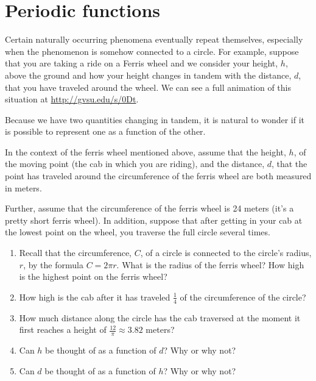 \documentclass[nooutcomes]{ximera}
\begin{document}

\section{Periodic functions}

Certain naturally occurring phenomena eventually repeat themselves, especially when the phenomenon is somehow connected to a circle. For example, suppose that you are taking a ride on a Ferris wheel and we consider your height, $h$, above the ground and how your height changes in tandem with the distance, $d$, that you have traveled around the wheel. We can see a full animation of this situation at \url{http://gvsu.edu/s/0Dt}. 

Because we have two quantities changing in tandem, it is natural to wonder if it is possible to represent one as a function of the other.


\begin{exploration}
In the context of the ferris wheel mentioned above, assume that the height, $h$, of the moving point (the cab in which you are riding), and the distance, $d$, that the point has traveled around the circumference of the ferris wheel are both measured in meters.

Further, assume that the circumference of the ferris wheel is 24 meters (it's a pretty short ferris wheel). In addition, suppose that after getting in your cab at the lowest point on the wheel, you traverse the full circle several times.

\begin{enumerate}
\item Recall that the circumference, $C$, of a circle is connected to the circle's radius, $r$, by the formula $C = 2\pi r$. What is the radius of the ferris wheel? How high is the highest point on the ferris wheel?

\item How high is the cab after it has traveled $\frac{1}{4}$ of the circumference of the circle?

\item How much distance along the circle has the cab traversed at the moment it first reaches a height of $\frac{12}{\pi} \approx 3.82$ meters?

\item Can $h$ be thought of as a function of $d$? Why or why not?

\item Can $d$ be thought of as a function of $h$? Why or why not?
\end{enumerate}
\end{exploration}
\end{document}

